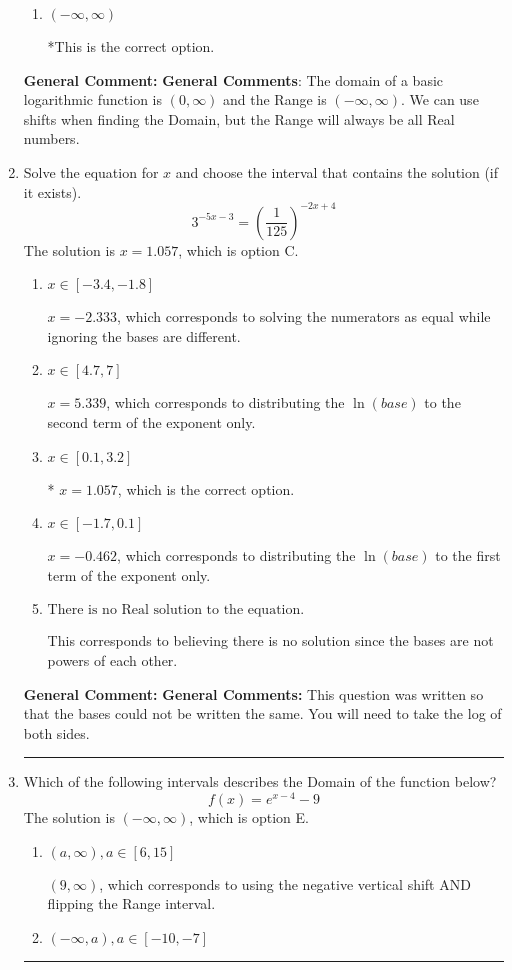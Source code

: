 \documentclass{extbook}[14pt]
\newcommand{\litem}[1]{\item #1

\rule{\textwidth}{0.4pt}}
\begin{document}
\begin{enumerate}
{\begin{enumerate}[label=\Alph*.]
$[-5, \infty)$, which corresponds to using the negative of the horizontal shift AND including the endpoint.
\item \( (-\infty, \infty) \)

*This is the correct option.
\end{enumerate}

\textbf{General Comment:} \textbf{General Comments}: The domain of a basic logarithmic function is $(0, \infty)$ and the Range is $(-\infty, \infty)$. We can use shifts when finding the Domain, but the Range will always be all Real numbers.
}
\litem{
Solve the equation for $x$ and choose the interval that contains the solution (if it exists).
\[ 3^{-5x-3} = \left(\frac{1}{125}\right)^{-2x+4} \]The solution is \( x = 1.057 \), which is option C.\begin{enumerate}[label=\Alph*.]
\item \( x \in [-3.4, -1.8] \)

$x = -2.333$, which corresponds to solving the numerators as equal while ignoring the bases are different.
\item \( x \in [4.7, 7] \)

$x = 5.339$, which corresponds to distributing the $\ln(base)$ to the second term of the exponent only.
\item \( x \in [0.1, 3.2] \)

* $x = 1.057$, which is the correct option.
\item \( x \in [-1.7, 0.1] \)

$x = -0.462$, which corresponds to distributing the $\ln(base)$ to the first term of the exponent only.
\item \( \text{There is no Real solution to the equation.} \)

This corresponds to believing there is no solution since the bases are not powers of each other.
\end{enumerate}

\textbf{General Comment:} \textbf{General Comments:} This question was written so that the bases could not be written the same. You will need to take the log of both sides.
}
\litem{
Which of the following intervals describes the Domain of the function below?
\[ f(x) = e^{x-4}-9 \]The solution is \( (-\infty, \infty) \), which is option E.\begin{enumerate}[label=\Alph*.]
\item \( (a, \infty), a \in [6, 15] \)

$(9, \infty)$, which corresponds to using the negative vertical shift AND flipping the Range interval.
\item \( (-\infty, a), a \in [-10, -7] \)


\end{enumerate}}
\end{enumerate}
\end{document}
